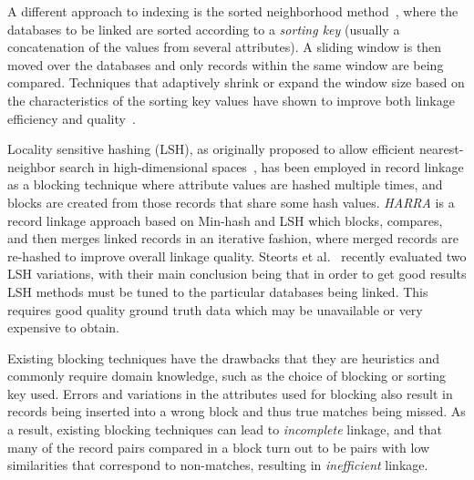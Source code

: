 \documentclass{llncs}
\begin{document}
A different approach to indexing is the sorted neighborhood 
method~\cite{Mon96}, where the databases to be linked are sorted
according to a \emph{sorting key} (usually a concatenation of the
values from several attributes). A sliding window is then moved over
the databases and only records within the same window are being
compared. Techniques that adaptively shrink or expand the window size based on
the characteristics of the sorting key values have shown to improve
both linkage efficiency and quality~\cite{Dra12}.


Locality sensitive hashing (LSH), as originally proposed to allow
efficient nearest-neighbor search in high-dimensional
spaces~\cite{Ind98}, has been employed in record linkage as a blocking
technique where attribute values are hashed multiple times, and
blocks are created from those records that share some hash values.
\emph{HARRA} is a record linkage approach based on Min-hash and LSH
which blocks, compares, and then merges linked records in an iterative
fashion, where merged records are re-hashed to improve overall linkage
quality. Steorts et al.~\cite{Steorts2014} recently evaluated two LSH
variations, with their main conclusion being that in order to get good
results LSH methods must be tuned to the particular databases being
linked. This requires good quality ground truth data which may be
unavailable or very expensive to obtain.

Existing blocking techniques have the drawbacks that they are
heuristics and commonly require domain knowledge, such as the choice
of blocking or sorting key used. Errors and variations in the
attributes used for blocking also result in records being inserted
into a wrong block and thus true matches being missed. As a result,
existing blocking techniques can lead to \emph{incomplete} linkage,
and that many of the record pairs compared in a block turn out to be
pairs with low similarities that correspond to non-matches, resulting
in \emph{inefficient} linkage.


\iffalse

\end{document}
